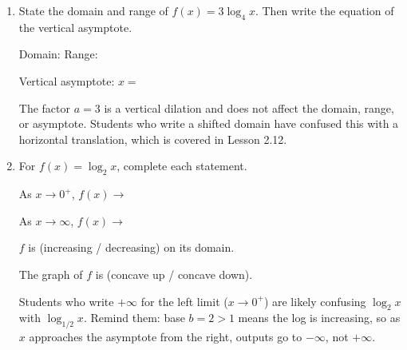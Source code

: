 \documentclass[10pt]{article}
\begin{document}
\namedateperiod

\vspace{0.15in}

\begin{enumerate}[leftmargin=1.8em, itemsep=18pt]

\item State the domain and range of $f(x) = 3\log_4 x$. Then write the equation of the
      vertical asymptote.

\vspace{6pt}
Domain:  \qquad Range: 

\vspace{8pt}
Vertical asymptote: $x = $ 

\begin{teachernote}
The factor $a = 3$ is a vertical dilation and does not affect the domain, range, or asymptote.
Students who write a shifted domain have confused this with a horizontal translation, which is
covered in Lesson 2.12.
\end{teachernote}

\vspace{10pt}

\item For $f(x) = \log_2 x$, complete each statement.

\vspace{6pt}
As $x \to 0^+$, \quad $f(x) \to $ \ans{$-\infty$}

\vspace{8pt}
As $x \to \infty$, \quad $f(x) \to $ \ans{$+\infty$}

\vspace{8pt}
$f$ is \hspace{0.3cm}  \hspace{0.3cm} (increasing / decreasing) on its domain.

\vspace{8pt}
The graph of $f$ is \hspace{0.3cm}  \hspace{0.3cm} (concave up / concave down).

\begin{teachernote}
Students who write $+\infty$ for the left limit ($x \to 0^+$) are likely confusing $\log_2 x$
with $\log_{1/2} x$. Remind them: base $b = 2 > 1$ means the log is increasing, so as $x$
approaches the asymptote from the right, outputs go to $-\infty$, not $+\infty$.
\end{teachernote}

\end{enumerate}
\end{document}
